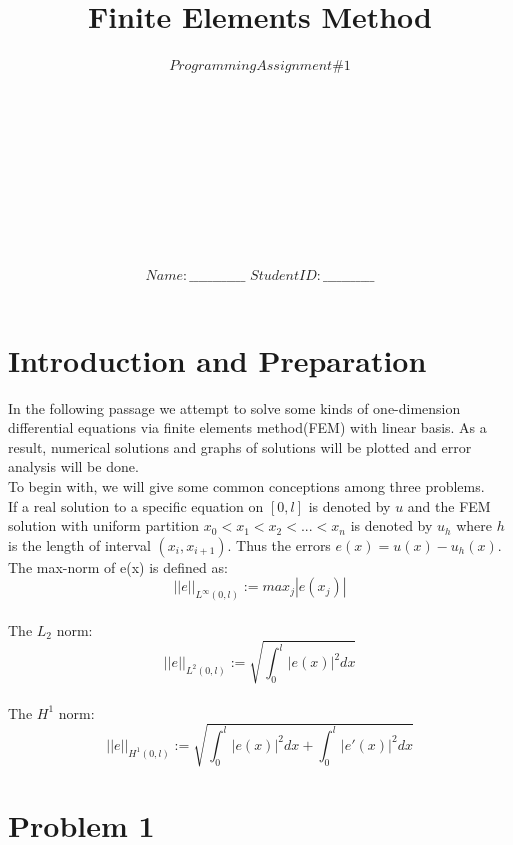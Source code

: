 \documentclass[a4paper,12pt]{article}
\begin{document}
\title{ \textbf{\Huge{Finite Elements Method}} \newline}

\author{\textbf{\Huge{$Programming  Assignment\#1$}}\\ \\ \\ \\ \\ \\ \\ \\ \\ \\ }

\date{ \textbf{\Huge{$Name: \_\_\_\_\_\_\_\_\_\_\_\_$}} \newline\newline\newline\newline\newline \textbf{\Huge{$Student  ID: \_\_\_\_\_\_\_\_\_\_\_$}}}

\maketitle
\newpage
\section{Introduction and Preparation}
In the following passage we attempt to solve some kinds of one-dimension differential equations via finite elements method(FEM) with linear basis. As a result, numerical solutions and graphs of solutions will be plotted and error analysis will be done.
\\ To begin with, we will give some common conceptions among three problems.
\\ If a real solution to a specific equation on $[0, l]$ is denoted by $u$ and the FEM solution with uniform partition $x_0<x_1<x_2<...<x_n$ is denoted by $u_h$ where $h$ is the length of interval $\left(x_i, x_{i+1}\right)$. Thus the errors $e(x) = u(x) - u_h(x)$.
\\ The max-norm of e(x) is defined as:
$$||e||_{L^{\infty}(0,l)}:=max_j|e(x_j)|$$
\\ The $L_2$ norm:
$$||e||_{L^{2}(0,l)}:=\sqrt{\int_0^l|e(x)|^2dx}$$
\\ The $H^1$ norm:
$$||e||_{H^{1}(0,l)}:=\sqrt{\int_0^l|e(x)|^2dx+\int_0^l|e'(x)|^2dx}$$

\section{Problem 1}
\end{document}
